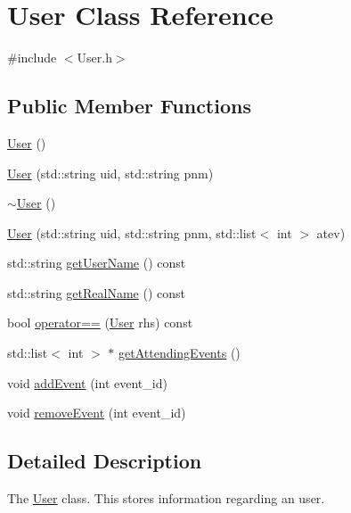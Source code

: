 \hypertarget{class_user}{}\section{User Class Reference}
\label{class_user}


{\ttfamily \#include $<$User.\+h$>$}

\subsection*{Public Member Functions}
\begin{DoxyCompactItemize}
\item 
\mbox{\hyperlink{class_user_a4a0137053e591fbb79d9057dd7d2283d}{User}} ()
\item 
\mbox{\hyperlink{class_user_af7ad8135c0c766d006eadedf51e34013}{User}} (std\+::string uid, std\+::string pnm)
\item 
\mbox{\hyperlink{class_user_ac00b72ad64eb4149f7b21b9f5468c2b2}{$\sim$\+User}} ()
\item 
\mbox{\hyperlink{class_user_abf30fe432e25c1d0c1ad60a50604bc92}{User}} (std\+::string uid, std\+::string pnm, std\+::list$<$ int $>$ atev)
\item 
std\+::string \mbox{\hyperlink{class_user_a7eff012d6182f6829329620d8e21b124}{get\+User\+Name}} () const
\item 
std\+::string \mbox{\hyperlink{class_user_a708784a199b60567f59b51d5401167d3}{get\+Real\+Name}} () const
\item 
bool \mbox{\hyperlink{class_user_a0a703687045c47c1b3375a53e0a2f572}{operator==}} (\mbox{\hyperlink{class_user}{User}} rhs) const
\item 
std\+::list$<$ int $>$ $\ast$ \mbox{\hyperlink{class_user_a9ef7239820bb7fdc48f988514a79286b}{get\+Attending\+Events}} ()
\item 
void \mbox{\hyperlink{class_user_acb78258d9d2f5b257677746c17ef2137}{add\+Event}} (int event\+\_\+id)
\item 
void \mbox{\hyperlink{class_user_aa6e7e42777a61cb2c6202c3314e4bde3}{remove\+Event}} (int event\+\_\+id)
\end{DoxyCompactItemize}


\subsection{Detailed Description}
The \mbox{\hyperlink{class_user}{User}} class. This stores information regarding an user. 

